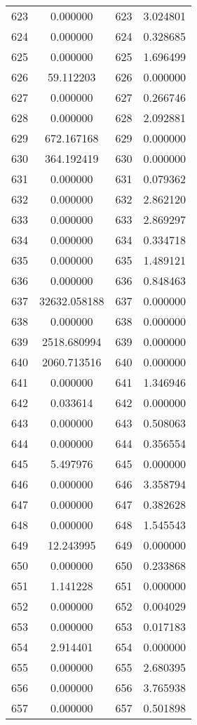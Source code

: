 \documentclass[12pt]{article}
\begin{document}
\begin{longtable}{@{}cccc@{}}
623 & 0.000000 & 623 & 3.024801 \\
624 & 0.000000 & 624 & 0.328685 \\
625 & 0.000000 & 625 & 1.696499 \\
626 & 59.112203 & 626 & 0.000000 \\
627 & 0.000000 & 627 & 0.266746 \\
628 & 0.000000 & 628 & 2.092881 \\
629 & 672.167168 & 629 & 0.000000 \\
630 & 364.192419 & 630 & 0.000000 \\
631 & 0.000000 & 631 & 0.079362 \\
632 & 0.000000 & 632 & 2.862120 \\
633 & 0.000000 & 633 & 2.869297 \\
634 & 0.000000 & 634 & 0.334718 \\
635 & 0.000000 & 635 & 1.489121 \\
636 & 0.000000 & 636 & 0.848463 \\
637 & 32632.058188 & 637 & 0.000000 \\
638 & 0.000000 & 638 & 0.000000 \\
639 & 2518.680994 & 639 & 0.000000 \\
640 & 2060.713516 & 640 & 0.000000 \\
641 & 0.000000 & 641 & 1.346946 \\
642 & 0.033614 & 642 & 0.000000 \\
643 & 0.000000 & 643 & 0.508063 \\
644 & 0.000000 & 644 & 0.356554 \\
645 & 5.497976 & 645 & 0.000000 \\
646 & 0.000000 & 646 & 3.358794 \\
647 & 0.000000 & 647 & 0.382628 \\
648 & 0.000000 & 648 & 1.545543 \\
649 & 12.243995 & 649 & 0.000000 \\
650 & 0.000000 & 650 & 0.233868 \\
651 & 1.141228 & 651 & 0.000000 \\
652 & 0.000000 & 652 & 0.004029 \\
653 & 0.000000 & 653 & 0.017183 \\
654 & 2.914401 & 654 & 0.000000 \\
655 & 0.000000 & 655 & 2.680395 \\
656 & 0.000000 & 656 & 3.765938 \\
657 & 0.000000 & 657 & 0.501898 \\

\end{longtable}
\end{document}
